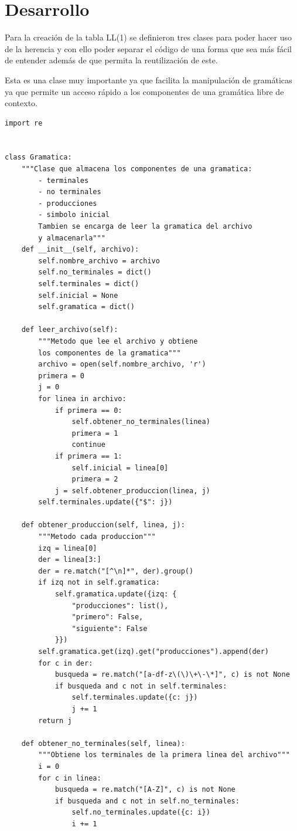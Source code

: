 \documentclass[12pt, titlepage]{article}
\begin{document}
    \section{Desarrollo}
Para la creación de la tabla LL(1) se definieron tres clases para poder hacer 
uso de la herencia y con ello poder separar el código de una forma que sea más 
fácil de entender además de que permita la reutilización de este.

    Esta es una clase muy importante ya que facilita la manipulación de 
gramáticas ya que permite un acceso rápido a los componentes de una gramática 
libre de contexto.
    \begin{lstlisting}[title=Archivo: gramatica.py]
import re


class Gramatica:
    """Clase que almacena los componentes de una gramatica:
        - terminales
        - no terminales
        - producciones
        - simbolo inicial
        Tambien se encarga de leer la gramatica del archivo
        y almacenarla"""
    def __init__(self, archivo):
        self.nombre_archivo = archivo
        self.no_terminales = dict()
        self.terminales = dict()
        self.inicial = None
        self.gramatica = dict()

    def leer_archivo(self):
        """Metodo que lee el archivo y obtiene
        los componentes de la gramatica"""
        archivo = open(self.nombre_archivo, 'r')
        primera = 0
        j = 0
        for linea in archivo:
            if primera == 0:
                self.obtener_no_terminales(linea)
                primera = 1
                continue
            if primera == 1:
                self.inicial = linea[0]
                primera = 2
            j = self.obtener_produccion(linea, j)
        self.terminales.update({"$": j})

    def obtener_produccion(self, linea, j):
        """Metodo cada produccion"""
        izq = linea[0]
        der = linea[3:]
        der = re.match("[^\n]*", der).group()
        if izq not in self.gramatica:
            self.gramatica.update({izq: {
                "producciones": list(),
                "primero": False,
                "siguiente": False
            }})
        self.gramatica.get(izq).get("producciones").append(der)
        for c in der:
            busqueda = re.match("[a-df-z\(\)\+\-\*]", c) is not None
            if busqueda and c not in self.terminales:
                self.terminales.update({c: j})
                j += 1
        return j

    def obtener_no_terminales(self, linea):
        """Obtiene los terminales de la primera linea del archivo"""
        i = 0
        for c in linea:
            busqueda = re.match("[A-Z]", c) is not None
            if busqueda and c not in self.no_terminales:
                self.no_terminales.update({c: i})
                i += 1
    \end{lstlisting}
\end{document}
